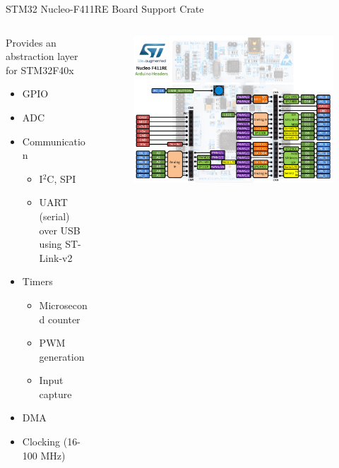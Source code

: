\documentclass[
  aspectratio=169,
]{beamer}
\begin{document}
\begin{frame}{STM32 Nucleo-F411RE Board Support Crate}
\begin{columns}[T] %
\hfill%
\begin{column}{.53\textwidth}
\vspace{-2mm}
Provides an abstraction layer for STM32F40x
\begin{itemize}
\item GPIO
\item ADC
\item Communication
	\begin{itemize}
	\item I$^2$C, SPI
	\item UART (serial) over USB using ST-Link-v2
	\end{itemize}
\item Timers
	\begin{itemize}
	\item Microsecond counter
	\item PWM generation
	\item Input capture
	\end{itemize}
\item DMA
\item Clocking (16-100 MHz)
\end{itemize}
\end{column}%
\hfill%
\begin{column}{.47\textwidth}
\vspace{-5mm}
\begin{figure}
\includegraphics[width=1.03\textwidth,height=1.03\textheight,keepaspectratio]{Nucleo_f411re.png}
\end{figure}
\end{column}%
\end{columns}

\end{frame}
\end{document}
